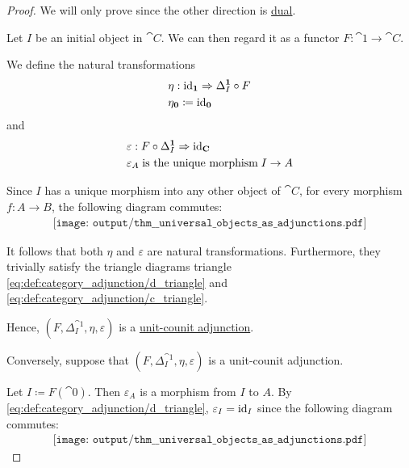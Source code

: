 \begin{proof}
  We will only prove  since the other direction is \hyperref[thm:categorical_principle_of_duality]{dual}.

  \SufficiencySubProof Let \( I \) be an initial object in \( \cat{C} \). We can then regard it as a functor \( F: \cat{1} \to \cat{C} \).

  We define the natural transformations
  \begin{equation*}
    \begin{aligned}
      &\eta: \id_{\cat{1}} \Rightarrow \Delta_I^{\cat{1}} \bincirc F \\
      &\eta_{\cat{0}} \coloneqq \id_{\cat{0}}
    \end{aligned}
  \end{equation*}
  and
  \begin{equation*}
    \begin{aligned}
      &\varepsilon: F \bincirc \Delta_I^{\cat{1}} \Rightarrow \id_{\cat{C}} \\
      &\varepsilon_A \T{is the unique morphism} I \to A
    \end{aligned}
  \end{equation*}

  Since \( I \) has a unique morphism into any other object of \( \cat{C} \), for every morphism \( f: A \to B \), the following diagram commutes:
  \begin{equation}\label{eq:thm:universal_objects_as_adjunctions/sufficiency_nat}
    \begin{aligned}
      \texttt{[image: output/thm\_\_universal\_objects\_as\_adjunctions.pdf]}
    \end{aligned}
  \end{equation}

  It follows that both \( \eta \) and \( \varepsilon \) are natural transformations. Furthermore, they trivially satisfy the triangle diagrams triangle \eqref{eq:def:category_adjunction/d_triangle} and \eqref{eq:def:category_adjunction/c_triangle}.

  Hence, \( (F, \Delta_I^{\cat{1}}, \eta, \varepsilon) \) is a \hyperref[def:category_adjunction/unit_counit]{unit-counit adjunction}.

  \NecessitySubProof Conversely, suppose that \( (F, \Delta_I^{\cat{1}}, \eta, \varepsilon) \) is a unit-counit adjunction.

  Let \( I \coloneqq F(\cat{0}) \). Then \( \varepsilon_A \) is a morphism from \( I \) to \( A \). By \eqref{eq:def:category_adjunction/d_triangle}, \( \varepsilon_I = \operatorname{id}_I \) since the following diagram commutes:
  \begin{equation}\label{eq:thm:universal_objects_as_adjunctions/d_triangle}
    \begin{aligned}
      \texttt{[image: output/thm\_\_universal\_objects\_as\_adjunctions.pdf]}
    \end{aligned}
  \end{equation}


\end{proof}

